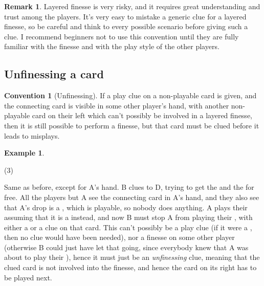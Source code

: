 \documentclass[a4paper]{article}
\theoremstyle{plain}
\theoremstyle{definition}
\newtheorem{remark}[theorem]{Remark}
\newtheorem{example}[theorem]{Example}
\newtheorem{convention}[theorem]{Convention}
\begin{document}
\begin{remark}
	Layered finesse is very risky, and it requires great understanding and trust among the players. It's very easy to mistake a generic clue for a layered finesse, so be careful and think to every possible scenario before giving such a clue. I recommend beginners not to use this convention until they are fully familiar with the finesse and with the play style of the other players.
\end{remark}

\subsection{Unfinessing a card}

\begin{convention}[Unfinessing]
	\label{unfinessing}
	If a play clue on a non-playable card is given, and the connecting card is visible in some other player's hand, with another non-playable card on their left which can't possibly be involved in a layered finesse, then it is still possible to perform a finesse, but that card must be clued before it leads to misplays.
\end{convention}

\begin{example}
	\hfill
	\begin{tasks}(3)
		\task[+]      
		\task[A]    
		\task[B]    
		\task[C]     
		\task[D]    
		\task[E]    
	\end{tasks}
	
	Same as before, except for A's hand. B clues  to D, trying to get the  and the  for free. All the players but A see the connecting card in A's hand, and they also see that A's drop is a , which is playable, so nobody does anything. A plays their  assuming that it is a  instead, and now B must stop A from playing their , with either a  or a  clue on that card. This can't possibly be a play clue (if it were a , then no clue would have been needed), nor a finesse on some other player (otherwise B could just have let that going, since everybody knew that A was about to play their ), hence it must just be an \textit{unfinessing} clue, meaning that the clued card is not involved into the finesse, and hence the card on its right has to be played next.
\end{example}
\end{document}
